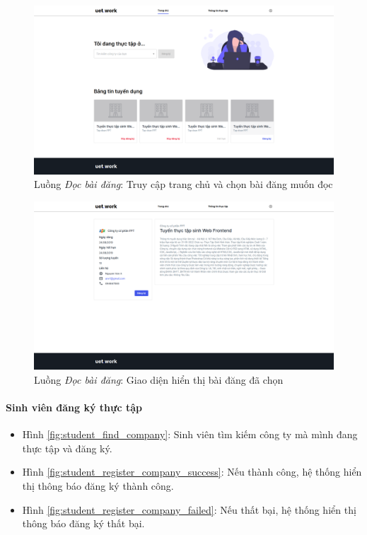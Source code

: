 \documentclass[./../main.tex]{subfiles}
\begin{document}
\begin{figure}[]
	\includegraphics[width=\linewidth]{./images/image37.png}
	\caption{Luồng \emph{Đọc bài đăng}: Truy cập trang chủ và chọn bài đăng muốn đọc}
	\label{fig:student_home_page}
\end{figure}

\begin{figure}[]
	\includegraphics[width=\linewidth]{./images/image81.png}
	\caption{Luồng \emph{Đọc bài đăng}: Giao diện hiển thị bài đăng đã chọn}
	\label{fig:student_read_post_page}
\end{figure}

\paragraph*{Sinh viên đăng ký thực tập}

\begin{itemize}
	\item Hình \ref{fig:student_find_company}: Sinh viên tìm kiếm công ty mà mình đang thực tập và đăng ký.
	\item Hình \ref{fig:student_register_company_success}: Nếu thành công, hệ thống hiển thị thông báo đăng ký thành công.
	\item Hình \ref{fig:student_register_company_failed}: Nếu thất bại, hệ thống hiển thị thông báo đăng ký thất bại.
\end{itemize}
\end{document}
